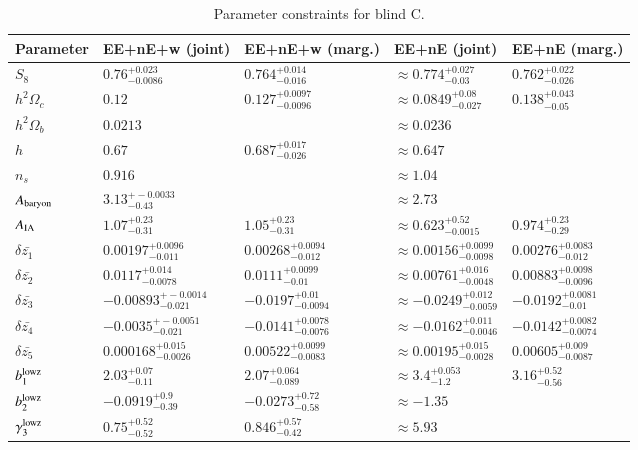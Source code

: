 \begin{table}
\begin{center}
\caption{Parameter constraints for blind C. }
\begin{tabular}{lllll}
    \toprule
    Parameter             & EE+nE+w (joint)  & EE+nE+w (marg.)  & EE+nE (joint)  & EE+nE (marg.) \\
    \midrule
$S_8     $& $0.76^{+0.023}_{-0.0086}$ & $0.764^{+0.014}_{-0.016}$& $\approx 0.774^{+0.027}_{-0.03}$ & $0.762^{+0.022}_{-0.026}$\\
$h^2\Omega_c$& $0.12$ & $0.127^{+0.0097}_{-0.0096}$& $\approx 0.0849^{+0.08}_{-0.027}$ & $0.138^{+0.043}_{-0.05}$\\
$h^2\Omega_b$& $0.0213$ & & $\approx 0.0236$ & \\
$h       $& $0.67$ & $0.687^{+0.017}_{-0.026}$& $\approx 0.647$ & \\
$n_s     $& $0.916$ & & $\approx 1.04$ & \\
\midrule
$A_{\rm baryon}$& $3.13^{+-0.0033}_{-0.43}$ & & $\approx 2.73$ & \\
$A_{\rm IA}$& $1.07^{+0.23}_{-0.31}$ & $1.05^{+0.23}_{-0.31}$& $\approx 0.623^{+0.52}_{-0.0015}$ & $0.974^{+0.23}_{-0.29}$\\
$\delta \bar{z_1}$& $0.00197^{+0.0096}_{-0.011}$ & $0.00268^{+0.0094}_{-0.012}$& $\approx 0.00156^{+0.0099}_{-0.0098}$ & $0.00276^{+0.0083}_{-0.012}$\\
$\delta \bar{z_2}$& $0.0117^{+0.014}_{-0.0078}$ & $0.0111^{+0.0099}_{-0.01}$& $\approx 0.00761^{+0.016}_{-0.0048}$ & $0.00883^{+0.0098}_{-0.0096}$\\
$\delta \bar{z_3}$& $-0.00893^{+-0.0014}_{-0.021}$ & $-0.0197^{+0.01}_{-0.0094}$& $\approx -0.0249^{+0.012}_{-0.0059}$ & $-0.0192^{+0.0081}_{-0.01}$\\
$\delta \bar{z_4}$& $-0.0035^{+-0.0051}_{-0.021}$ & $-0.0141^{+0.0078}_{-0.0076}$& $\approx -0.0162^{+0.011}_{-0.0046}$ & $-0.0142^{+0.0082}_{-0.0074}$\\
$\delta \bar{z_5}$& $0.000168^{+0.015}_{-0.0026}$ & $0.00522^{+0.0099}_{-0.0083}$& $\approx 0.00195^{+0.015}_{-0.0028}$ & $0.00605^{+0.009}_{-0.0087}$\\
$b_1^{\rm lowz}$& $2.03^{+0.07}_{-0.11}$ & $2.07^{+0.064}_{-0.089}$& $\approx 3.4^{+0.053}_{-1.2}$ & $3.16^{+0.52}_{-0.56}$\\
$b_2^{\rm lowz}$& $-0.0919^{+0.9}_{-0.39}$ & $-0.0273^{+0.72}_{-0.58}$& $\approx -1.35$ & \\
$\gamma_3^{\rm lowz}$& $0.75^{+0.52}_{-0.52}$ & $0.846^{+0.57}_{-0.42}$& $\approx 5.93$ & \\

\end{tabular}
\end{center}
\end{table}
